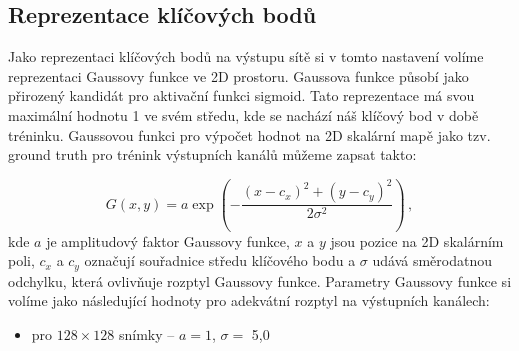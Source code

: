 \subsection{Reprezentace klíčových bodů}

Jako reprezentaci klíčových bodů na výstupu sítě si v tomto nastavení volíme reprezentaci Gaussovy funkce ve 2D prostoru. Gaussova funkce působí jako přirozený kandidát pro aktivační funkci sigmoid. Tato reprezentace má svou maximální hodnotu 1 ve svém středu, kde se nachází náš klíčový bod v době tréninku. Gaussovou funkci pro výpočet hodnot na 2D skalární mapě jako tzv. ground truth pro trénink výstupních kanálů můžeme zapsat takto:

\begin{equation}
    G(x, y) = a \exp\left(-\frac{(x - c_x)^2 + (y - c_y)^2}{2\sigma^2}\right)\,,
\end{equation}
kde $a$ je amplitudový faktor Gaussovy funkce, $x$ a $y$ jsou pozice na 2D skalárním poli, $c_x$ a $c_y$ označují souřadnice středu klíčového bodu a $\sigma$ udává směrodatnou odchylku, která ovlivňuje rozptyl Gaussovy funkce. Parametry Gaussovy funkce si volíme jako následující hodnoty pro adekvátní rozptyl na výstupních kanálech: 
\begin{itemize}
    \item pro $128 \times 128$ snímky -- $a=1$, $\sigma=$ 5,0
\end{itemize}

